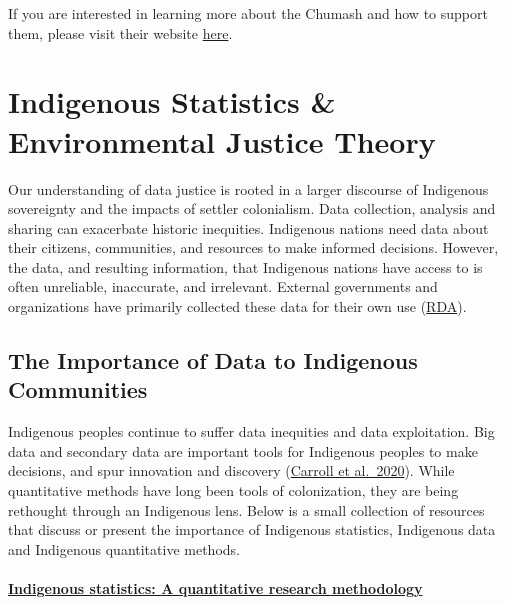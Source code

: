 \documentclass[
]{book}
\begin{document}
If you are interested in learning more about the Chumash and how to support them, please visit their website \href{https://www.wishtoyo.org/}{here}.

\hypertarget{indigenous-statistics-environmental-justice-theory}{%
\chapter{Indigenous Statistics \& Environmental Justice Theory}\label{indigenous-statistics-environmental-justice-theory}}

Our understanding of data justice is rooted in a larger discourse of Indigenous sovereignty and the impacts of settler colonialism. Data collection, analysis and sharing can exacerbate historic inequities. Indigenous nations need data about their citizens, communities, and resources to make informed decisions. However, the data, and resulting information, that Indigenous nations have access to is often unreliable, inaccurate, and irrelevant. External governments and organizations have primarily collected these data for their own use (\href{https://www.rd-alliance.org/group/international-indigenous-data-sovereignty-ig/case-statement/international-indigenous-data}{RDA}).

\hypertarget{the-importance-of-data-to-indigenous-communities}{%
\section{The Importance of Data to Indigenous Communities}\label{the-importance-of-data-to-indigenous-communities}}

Indigenous peoples continue to suffer data inequities and data exploitation. Big data and secondary data are important tools for Indigenous peoples to make decisions, and spur innovation and discovery (\href{https://repository.oceanbestpractices.org/bitstream/handle/11329/1507/1158-8528-2-PB.pdf?sequence=1\&isAllowed=y}{Carroll et al.~2020}). While quantitative methods have long been tools of colonization, they are being rethought through an Indigenous lens. Below is a small collection of resources that discuss or present the importance of Indigenous statistics, Indigenous data and Indigenous quantitative methods.

\hypertarget{indigenous-statistics-a-quantitative-research-methodology}{%
\subsubsection{\texorpdfstring{\href{https://www.taylorfrancis.com/books/mono/10.4324/9781315426570/indigenous-statistics-maggie-walter-chris-andersen}{Indigenous statistics: A quantitative research methodology}}{Indigenous statistics: A quantitative research methodology}}\label{indigenous-statistics-a-quantitative-research-methodology}}
\end{document}
